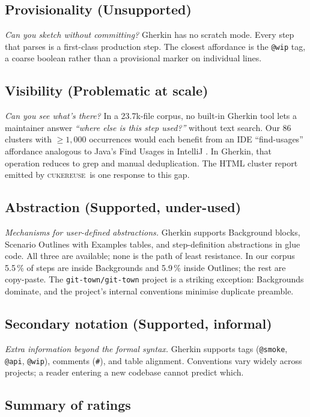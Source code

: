 \documentclass[11pt,a4paper]{article}
\newcommand{\tool}{\textsc{cukereuse}\xspace}
\begin{document}
\subsection{Provisionality (Unsupported)}
\textit{Can you sketch without committing?} Gherkin has no
scratch mode. Every step that parses is a first-class production
step. The closest affordance is the \texttt{@wip} tag, a coarse
boolean rather than a provisional marker on individual lines.

\subsection{Visibility (Problematic at scale)}
\textit{Can you see what's there?} In a 23.7k-file corpus, no
built-in Gherkin tool lets a maintainer answer \emph{``where else is
this step used?''} without text search. Our 86 clusters with
$\geq 1{,}000$ occurrences would each benefit from an IDE
``find-usages'' affordance analogous to Java's Find Usages in IntelliJ
\citep{intellij2024findusages}. In Gherkin, that operation reduces to
grep and manual deduplication. The HTML cluster report emitted by
\tool\ is one response to this gap.

\subsection{Abstraction (Supported, under-used)}
\textit{Mechanisms for user-defined abstractions.} Gherkin supports
Background blocks, Scenario Outlines with Examples tables, and
step-definition abstractions in glue code. All three are available;
none is the path of least resistance. In our corpus 5.5\,\% of steps
are inside Backgrounds and 5.9\,\% inside Outlines; the rest are
copy-paste. The \texttt{git-town/git-town} project
\citep{gittown2024} is a striking exception: Backgrounds dominate,
and the project's internal conventions minimise duplicate preamble.

\subsection{Secondary notation (Supported, informal)}
\textit{Extra information beyond the formal syntax.} Gherkin supports
tags (\texttt{@smoke}, \texttt{@api}, \texttt{@wip}), comments
(\texttt{\#}), and table alignment. Conventions vary widely across
projects; a reader entering a new codebase cannot predict which.

\subsection{Summary of ratings}
\end{document}
